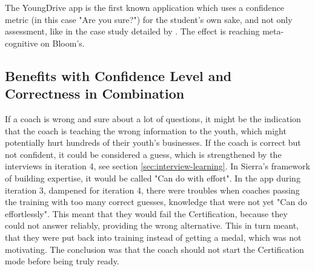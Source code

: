   The YoungDrive app is the first known application which uses a confidence metric (in this case "Are you sure?") for the student's own sake, and not only assessment, like in the case study detailed by \cite{nicol}. The effect is reaching meta-cognitive on Bloom's.





  \subsection{Benefits with Confidence Level and Correctness in Combination}
  If a coach is wrong and sure about a lot of questions, it might be the indication that the coach is teaching the wrong information to the youth, which might potentially hurt hundreds of their youth's businesses. If the coach is correct but not confident, it could be considered a guess, which is strengthened by the interviews in iteration 4, see section \ref{sec:interview-learning}. In Sierra's framework of building expertise, it would be called "Can do with effort". In the app during iteration 3, dampened for iteration 4, there were troubles when coaches passing the training with too many correct guesses, knowledge that were not yet "Can do effortlessly". This meant that they would fail the Certification, because they could not answer reliably, providing the wrong alternative. This in turn meant, that they were put back into training instead of getting a medal, which was not motivating. The conclusion was that the coach should not start the Certification mode before being truly ready.

